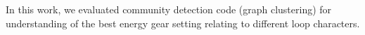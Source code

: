 In this work, we evaluated community detection code (graph clustering)  
for understanding of the best energy gear setting relating to different loop characters.

